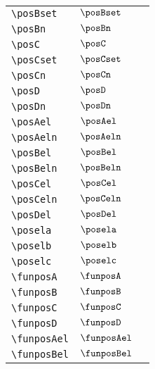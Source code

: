 \begin{longtable}{lll}
 {\color[rgb]{0.5,0.5,0.5}\texttt{\textbackslash posBset}} & $\posBset$ & \\ 
 {\color[rgb]{0.5,0.5,0.5}\texttt{\textbackslash posBn}} & $\posBn$ & \\ 
 {\color[rgb]{0.5,0.5,0.5}\texttt{\textbackslash posC}} & $\posC$ & \\ 
 {\color[rgb]{0.5,0.5,0.5}\texttt{\textbackslash posCset}} & $\posCset$ & \\ 
 {\color[rgb]{0.5,0.5,0.5}\texttt{\textbackslash posCn}} & $\posCn$ & \\ 
 {\color[rgb]{0.5,0.5,0.5}\texttt{\textbackslash posD}} & $\posD$ & \\ 
 {\color[rgb]{0.5,0.5,0.5}\texttt{\textbackslash posDn}} & $\posDn$ & \\ 
 {\color[rgb]{0.5,0.5,0.5}\texttt{\textbackslash posAel}} & $\posAel$ & \\ 
 {\color[rgb]{0.5,0.5,0.5}\texttt{\textbackslash posAeln}} & $\posAeln$ & \\ 
 {\color[rgb]{0.5,0.5,0.5}\texttt{\textbackslash posBel}} & $\posBel$ & \\ 
 {\color[rgb]{0.5,0.5,0.5}\texttt{\textbackslash posBeln}} & $\posBeln$ & \\ 
 {\color[rgb]{0.5,0.5,0.5}\texttt{\textbackslash posCel}} & $\posCel$ & \\ 
 {\color[rgb]{0.5,0.5,0.5}\texttt{\textbackslash posCeln}} & $\posCeln$ & \\ 
 {\color[rgb]{0.5,0.5,0.5}\texttt{\textbackslash posDel}} & $\posDel$ & \\ 
 {\color[rgb]{0.5,0.5,0.5}\texttt{\textbackslash posela}} & $\posela$ & \\ 
 {\color[rgb]{0.5,0.5,0.5}\texttt{\textbackslash poselb}} & $\poselb$ & \\ 
 {\color[rgb]{0.5,0.5,0.5}\texttt{\textbackslash poselc}} & $\poselc$ & \\ 
 {\color[rgb]{0.5,0.5,0.5}\texttt{\textbackslash funposA}} & $\funposA$ & \\ 
 {\color[rgb]{0.5,0.5,0.5}\texttt{\textbackslash funposB}} & $\funposB$ & \\ 
 {\color[rgb]{0.5,0.5,0.5}\texttt{\textbackslash funposC}} & $\funposC$ & \\ 
 {\color[rgb]{0.5,0.5,0.5}\texttt{\textbackslash funposD}} & $\funposD$ & \\ 
 {\color[rgb]{0.5,0.5,0.5}\texttt{\textbackslash funposAel}} & $\funposAel$ & \\ 
 {\color[rgb]{0.5,0.5,0.5}\texttt{\textbackslash funposBel}} & $\funposBel$ & \\ 

\end{longtable}
